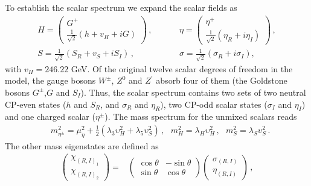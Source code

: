 \documentclass[12pt]{article}
\begin{document}
To establish the scalar spectrum we expand the scalar fields as
%
\begin{align*}
  H = \begin{pmatrix}G^+ \\ \frac{1}{\sqrt{2}} (h+v_H+iG) \end{pmatrix} \,,&\hspace{1cm}
  \eta = \begin{pmatrix}\eta^{+} \\ \frac{1}{\sqrt{2}}(\eta_R+i\eta_I) \end{pmatrix} \,,\\
  S = \frac{1}{\sqrt{2}} (S_R+v_{S}+iS_I)\,,&\hspace{1cm}\sigma = \frac{1}{\sqrt{2}} (\sigma_R+i\sigma_I),
\end{align*}
%
with $v_H= 246.22$ GeV.  
%
%
Of the original twelve scalar degrees of freedom in the model, the gauge bosons $W^{\pm}$, $Z^{0}$ and $Z^{\prime}$ absorb four of them (the Goldstone bosons $G^{\pm}$,$G$ and $S_{I}$). Thus, the scalar spectrum contains two sets of two neutral CP-even states ($h$ and $S_{R}$,  and $\sigma_{R}$ and $\eta_{R}$), two CP-odd scalar states ($\sigma_{I}$ and $\eta_{I}$) and one charged scalar ($\eta^{\pm}$). 
The mass spectrum for the unmixed scalars reads
\begin{align*}
   & m_{\eta^{\pm}}^{2}= \mu_{\eta}^{2} + \frac{1}{2} (\lambda_{3} \upsilon^{2}_{H} + \lambda_{5} \upsilon^{2}_{S} )\,,\,\,\,\, m_{H}^{2} = \lambda_{H} \upsilon_{H}^{2}\,,\,\,\,\,    m_{S}^{2}= \lambda_{S} \upsilon_{S}^{2}\,.
\end{align*}
%
The other mass eigenstates are defined as
%
\begin{align*}
    \begin{pmatrix}\chi_{(R,I)_{1}} \\ \chi_{(R,I)_{2}} \end{pmatrix} =& \begin{pmatrix} \cos\theta & -\sin\theta \\ \sin\theta & \cos\theta \end{pmatrix} \begin{pmatrix}\sigma_{(R,I)} \\ \eta_{(R,I)} \end{pmatrix} \,,
\end{align*}
\end{document}
